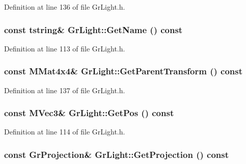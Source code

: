 Definition at line 136 of file GrLight.h.\hypertarget{class_gr_light_e1ffc9555baeb3ff122b8faeafc152b0}{
\subsubsection[{GetName}]{\setlength{\rightskip}{0pt plus 5cm}const {\bf tstring}\& GrLight::GetName () const}}
\label{class_gr_light_e1ffc9555baeb3ff122b8faeafc152b0}




Definition at line 113 of file GrLight.h.\hypertarget{class_gr_light_14f915382adbb5e9e24f5f5a87c12930}{
\subsubsection[{GetParentTransform}]{\setlength{\rightskip}{0pt plus 5cm}const {\bf MMat4x4}\& GrLight::GetParentTransform () const}}
\label{class_gr_light_14f915382adbb5e9e24f5f5a87c12930}




Definition at line 137 of file GrLight.h.\hypertarget{class_gr_light_0d4a1686505a6cacd389144659887e73}{
\subsubsection[{GetPos}]{\setlength{\rightskip}{0pt plus 5cm}const {\bf MVec3}\& GrLight::GetPos () const}}
\label{class_gr_light_0d4a1686505a6cacd389144659887e73}




Definition at line 114 of file GrLight.h.\hypertarget{class_gr_light_0df072bac3ea1048c4a57aed74bb2361}{
\subsubsection[{GetProjection}]{\setlength{\rightskip}{0pt plus 5cm}const {\bf GrProjection}\& GrLight::GetProjection () const}}
\label{class_gr_light_0df072bac3ea1048c4a57aed74bb2361}




